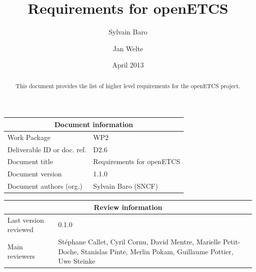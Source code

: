 \documentclass{template/openetcs_article}
\begin{document}
\frontmatter
{}




\title{Requirements for openETCS}


\date{April 2013}


\author{Sylvain Baro}
\author{Jan Welte}
  



%
\begin{abstract}
This document provides the list of higher level requirements for the openETCS project. 
\end{abstract}

\maketitle

% 

\begin{tabular}{|p{4.4cm}|p{8.7cm}|}
\hline
\multicolumn{2}{|c|}{Document information} \\
\hline
Work Package &  WP2  \\
Deliverable ID or doc. ref. & D2.6\\
\hline
Document title & Requirements for openETCS \\
Document version & 1.1.0 \\
Document authors (org.)  & Sylvain Baro (SNCF) \\
\hline
\end{tabular}

\begin{tabular}{|p{4.4cm}|p{8.7cm}|}
\hline
\multicolumn{2}{|c|}{Review information} \\
\hline
Last version reviewed & 0.1.0 \\
\hline
Main reviewers & St\'ephane Callet, Cyril Cornu, David Mentre, Marielle Petit-Doche, Stanislas Pinte, Merlin Pokam, Guillaume Pottier, Uwe Steinke\\
\hline
\end{tabular}
\end{document}

